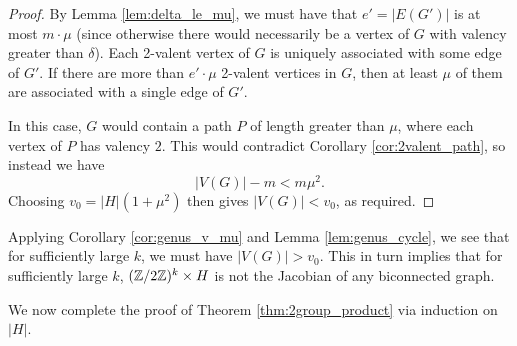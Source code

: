 \documentclass{amsart}
\begin{document}
\begin{proof}
  By Lemma \ref{lem:delta_le_mu}, we must have that $e' = |E(G')|$ is
  at most $m \cdot \mu$ (since otherwise there would necessarily be a
  vertex of $G$ with valency greater than $\delta$). Each 2-valent
  vertex of $G$ is uniquely associated with some edge of $G'$. If
  there are more than $e' \cdot \mu$ 2-valent vertices in $G$, then at
  least $\mu$ of them are associated with a single edge of $G'$.

  In this case, $G$ would contain a path $P$ of length greater than
  $\mu$, where each vertex of $P$ has valency $2$. This would
  contradict Corollary \ref{cor:2valent_path}, so instead we have
  \[
  |V(G)| - m < m\mu^2.
  \] 
  Choosing $v_0 = |H|(1 + \mu^2)$ then gives $|V(G)| < v_0$, as
  required.
\end{proof}

Applying Corollary \ref{cor:genus_v_mu} and Lemma
\ref{lem:genus_cycle}, we see that for sufficiently large $k$, we must
have $|V(G)| > v_0$. This in turn implies that for sufficiently large
$k$, $(\mathbb{Z}/2\mathbb{Z})^k \times H$ is not the Jacobian of any biconnected
graph.

We now complete the proof of Theorem \ref{thm:2group_product} via
induction on $|H|$.
  
\end{document}
